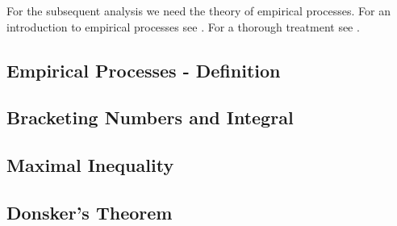 For the subsequent analysis we need the theory of empirical processes.
For an introduction to empirical processes see \cite[§19]{Vaart2000}. For a thorough treatment see \cite[§2]{vaart2013}. 
\subsection{Empirical Processes - Definition}
  
\subsection{Bracketing Numbers and Integral}
  
\subsection{Maximal Inequality}
  
\subsection{Donsker's Theorem}
  
